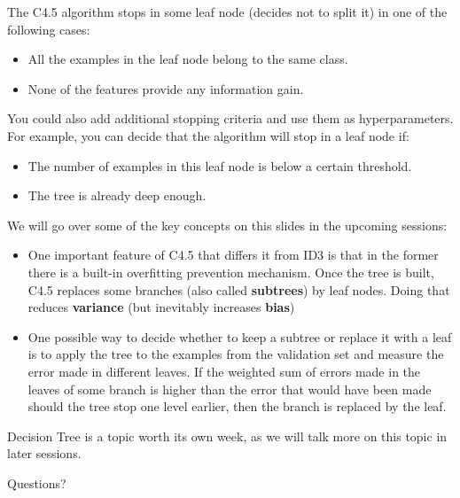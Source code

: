 \documentclass[9pt,dvipsnames]{beamer}
\begin{document}
	\begin{frame}
		The C4.5 algorithm stops in some leaf node (decides not to split it) in one of the following cases:
		
		\begin{itemize}
			\item All the examples in the leaf node belong to the same class.
			\item None of the features provide any information gain.
		\end{itemize}
		You could also add additional stopping criteria and use them as hyperparameters. For example, you can decide that the algorithm will stop in a leaf node if:
		\begin{itemize}
			\item The number of examples in this leaf node is below a certain threshold.
			\item The tree is already deep enough.
		\end{itemize}
	\end{frame}
	
	\begin{frame}
		We will go over some of the key concepts on this slides in the upcoming sessions:
		\begin{itemize}
			\item One important feature of C4.5 that differs it from ID3 is that in the former there is a built-in overfitting prevention mechanism. Once the tree is built, C4.5 replaces some branches (also called \textbf{subtrees}) by leaf nodes. Doing that reduces \textbf{variance} (but inevitably increases \textbf{bias})
			\item One possible way to decide whether to keep a subtree or replace it with a leaf is to apply the tree to the examples from the validation set and measure the error made in different leaves. If the weighted sum of errors made in the leaves of some branch is higher than the error that would have been made should the tree stop one level earlier, then the branch is replaced by the leaf.
		\end{itemize}
	\end{frame}
	
	\begin{frame}
	 Decision Tree is a topic worth its own week, as we will talk more on this topic in later sessions. 
	\end{frame}
	\begin{frame}
		\begin{center}
			\Huge Questions?
		\end{center}
	\end{frame}
\end{document}
